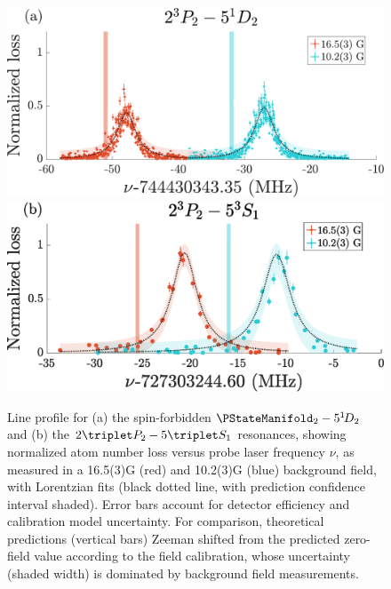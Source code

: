 \begin{figure}
      \includegraphics[width=\textwidth]{fig/spectroscopy/ci-plot-51D2.pdf}
    \includegraphics[width=\textwidth]{fig/spectroscopy/ci-plot-53S1}
   \caption{Line profile for (a) the spin-forbidden $\PStateManifold_2 -  5^{1\!}D_2$  and (b) the $2\triplet P_2 - 5\triplet S_1$  resonances, showing normalized atom number loss versus probe laser frequency $\nu$, as measured in a {16.5(3)}G (red) and {10.2(3)}G (blue) background field, with Lorentzian fits (black dotted line, with prediction confidence interval shaded).
	Error bars account for detector efficiency and calibration model uncertainty.
	For comparison, theoretical predictions (vertical bars) Zeeman shifted from the predicted zero-field value \cite{Drake07} according to the field calibration, whose uncertainty (shaded width) is dominated by background field measurements.}
    \label{fig:simple_lines}

\end{figure}



